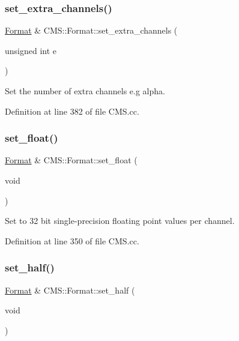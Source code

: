 \subsubsection{\texorpdfstring{set\+\_\+extra\+\_\+channels()}{set\_extra\_channels()}}
{\footnotesize\ttfamily \hyperlink{class_c_m_s_1_1_format}{Format} \& C\+M\+S\+::\+Format\+::set\+\_\+extra\+\_\+channels (\begin{DoxyParamCaption}\item[{unsigned int}]{e }\end{DoxyParamCaption})}



Set the number of \textquotesingle{}extra\textquotesingle{} channels e.\+g alpha. 



Definition at line 382 of file C\+M\+S.\+cc.

\mbox{\label{class_c_m_s_1_1_format_a22296c4caae182bf7a83e313e5665cab}} 
\subsubsection{\texorpdfstring{set\+\_\+float()}{set\_float()}}
{\footnotesize\ttfamily \hyperlink{class_c_m_s_1_1_format}{Format} \& C\+M\+S\+::\+Format\+::set\+\_\+float (\begin{DoxyParamCaption}\item[{void}]{ }\end{DoxyParamCaption})}



Set to 32 bit single-\/precision floating point values per channel. 



Definition at line 350 of file C\+M\+S.\+cc.

\mbox{\label{class_c_m_s_1_1_format_ad1cb544068caa54e3bcec68aa2854917}} 
\subsubsection{\texorpdfstring{set\+\_\+half()}{set\_half()}}
{\footnotesize\ttfamily \hyperlink{class_c_m_s_1_1_format}{Format} \& C\+M\+S\+::\+Format\+::set\+\_\+half (\begin{DoxyParamCaption}\item[{void}]{ }\end{DoxyParamCaption})}



